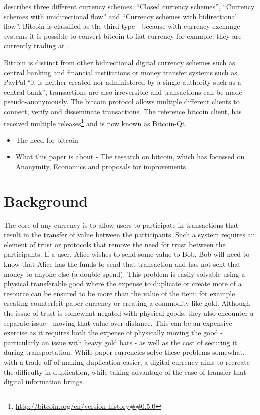 \textcite{euro-currency-schemes} describes three different currency schemes: ``Closed currency schemes'', ``Currency  schemes with unidirectional flow'' and ``Currency schemes with  bidirectional flow''. Bitcoin is classified as the third type - because  with currency exchange systems it is possible to convert bitcoin to fiat  currency for example: they are currently trading at .


Bitcoin is distinct from other bidirectional digital currency schemes such as central banking and financial institutions or money transfer systems such as PayPal\cite{paypal} ``it is neither created nor administered by a single authority such as a central bank''\cite{why-interesting}, transactions are also irreversible and transactions can be made pseudo-anonymously.  The bitcoin protocol allows multiple different clients to connect, verify and disseminate transactions.  The reference bitcoin client, has received multiple releases\footnote{\url{http://bitcoin.org/en/version-history##0.5.0}} and is now known as Bitcoin-Qt\cite{bitcoin-qt}.


\begin{itemize} \item The need for bitcoin \item What this paper is about - The
    research on bitcoin, which has focussed on Anonymity, Economics and
    proposals for improvements \end{itemize}

\section{Background}
The core of any currency is to allow users to participate in transactions that result in the transfer of value between the participants.  Such a system requires an element of trust or protocols that remove the need for trust between the participants.  If a user, Alice wishes to send some value to Bob, Bob will need to know that Alice has the funds to send that transaction and has not sent that money to anyone else (a double spend). This problem is easily solvable using a physical transferable good where the expense to duplicate or create more of a resource can be ensured to be more than the value of the item: for example creating counterfeit paper currency or creating a commodity like gold.  Although the issue of trust is somewhat negated with physical goods, they also encounter a separate issue - moving that value over distance.  This can be an expensive exercise as it requires both the expense of physically moving the good - particularly an issue with heavy gold bars - as well as the cost of securing it during transportation. While paper currencies solve these problems somewhat, with a trade-off of making duplication easier, a digital currency aims to recreate the difficulty in duplication, while taking advantage of the ease of transfer that digital information brings.

